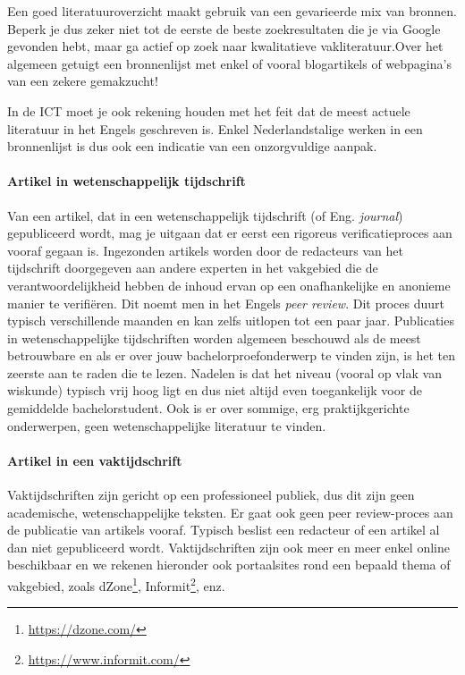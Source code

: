 Een goed literatuuroverzicht maakt gebruik van een gevarieerde mix van bronnen. Beperk je dus zeker niet tot de eerste de beste zoekresultaten die je via Google gevonden hebt, maar ga actief op zoek naar kwalitatieve vakliteratuur.Over het algemeen getuigt een bronnenlijst met enkel of vooral blogartikels of webpagina's van een zekere gemakzucht!

In de ICT moet je ook rekening houden met het feit dat de meest actuele literatuur in het Engels geschreven is. Enkel Nederlandstalige werken in een bronnenlijst is dus ook een indicatie van een onzorgvuldige aanpak.

\paragraph{Artikel in wetenschappelijk tijdschrift}

Van een artikel, dat in een wetenschappelijk tijdschrift (of Eng. \emph{journal}) gepubliceerd wordt, mag je uitgaan dat er eerst een rigoreus verificatieproces aan vooraf gegaan is. Ingezonden artikels worden door de redacteurs van het tijdschrift doorgegeven aan andere experten in het vakgebied die de verantwoordelijkheid hebben de inhoud ervan op een onafhankelijke en anonieme manier te verifiëren. Dit noemt men in het Engels \emph{peer review}. Dit proces duurt typisch verschillende maanden en kan zelfs uitlopen tot een paar jaar. Publicaties in wetenschappelijke tijdschriften worden algemeen beschouwd als de meest betrouwbare en als er over jouw bachelorproefonderwerp te vinden zijn, is het ten zeerste aan te raden die te lezen. Nadelen is dat het niveau (vooral op vlak van wiskunde) typisch vrij hoog ligt en dus niet altijd even toegankelijk voor de gemiddelde bachelorstudent. Ook is er over sommige, erg praktijkgerichte onderwerpen, geen wetenschappelijke literatuur te vinden.

\paragraph{Artikel in een vaktijdschrift}

Vaktijdschriften zijn gericht op een professioneel publiek, dus dit zijn geen academische, wetenschappelijke teksten. Er gaat ook geen peer review-proces aan de publicatie van artikels vooraf. Typisch beslist een redacteur of een artikel al dan niet gepubliceerd wordt. Vaktijdschriften zijn ook meer en meer enkel online beschikbaar en we rekenen hieronder ook portaalsites rond een bepaald thema of vakgebied, zoals dZone\footnote{\url{https://dzone.com/}}, Informit\footnote{\url{https://www.informit.com/}}, enz.

